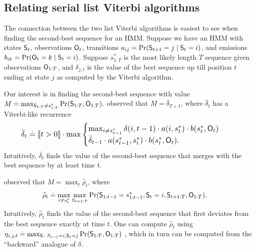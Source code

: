 %
\subsection{Relating serial list Viterbi algorithms}

The connection between the two list Viterbi algorithms is easiest to see when finding the second-best sequence for an HMM.
Suppose we have an HMM with states $\mathsf{S}_{t}$, observations $\mathsf{O}_{t}$, transitions $a_{ij} = \Pr( \mathsf{S}_{t+1} = j \mid \mathsf{S}_t = i )$, and emissions $b_{ik} = \Pr( \mathsf{O}_{t} = k \mid \mathsf{S}_t = i )$.
Suppose $s^*_{1:T}$ is the most likely length $T$ sequence given observations $\mathsf{O}_{1:T}$, and
$\delta_{j, t}$ is the value of the best sequence up till position $t$ ending at state $j$ as computed by the Viterbi algorithm.

Our interest is in finding the second-best sequence %
with value
$ M \stackrel{.}{=} \max_{\mathsf{S}_{1:T} \neq s^*_{1 : T}}{\Pr( \mathsf{S}_{1:T}, \mathsf{O}_{1:T} )}. $
\citet{seshadri1994list} %
observed that $M = \bar{\delta}_{T+1}$, where $\bar{\delta}_t$ has a Viterbi-like recurrence
\begin{equation}
    \label{eqn:att-recurrence}
    \resizebox{0.9\linewidth}{!}{$
    \begin{aligned}
        \bar{\delta}_t &\defEq 
        \indicator{t > 0} \cdot
        \max
        \begin{cases}
        \max_{i \neq s^*_{t-1}} \delta(i, t-1) \cdot a( i, s^*_{t} ) \cdot b( s^*_{t}, \OSf_{t} ) \\
        \bar{\delta}_{t - 1} \cdot a( s^*_{t - 1}, s^*_{t} ) \cdot b( s^*_{t}, \OSf_{t} ).
        \end{cases}%
    \end{aligned}
    $}
\end{equation}
Intuitively, $\bar{\delta}_t$ finds the value of the second-best sequence that merges with the best sequence by at least time $t$.


\citet{nilsson2001sequentially} observed that $M = \max_t \widehat{\rho}_t$, where
\begin{align*}
	\widehat{\rho}_{t} &\stackrel{.}{=} \max_{i \neq s^*_{t}} \max_{S_{t+1:T}} {\Pr( \mathsf{S}_{1:t-1} = s^*_{1:t-1}, \mathsf{S}_t = i, \mathsf{S}_{t+1:T}, \mathsf{O}_{1:T} )}.
\end{align*}
Intuitively, $\widehat{\rho}_t$ finds the value of the second-best sequence that first deviates from the best sequence exactly at time $t$.
One can compute $\widehat{\rho}_{t}$ using $\eta_{i, j, t} \stackrel{.}{=} \max_{\mathsf{S} \colon S_{t - 1} = i, \mathsf{S}_{t} = j} \Pr( \mathsf{S}_{1:T}, \mathsf{O}_{1:T} )$ \citep{nilsson2001sequentially},
which in turn can be computed from the ``backward'' analogue of $\delta$.

